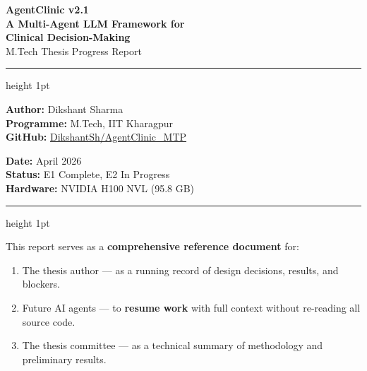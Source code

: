\documentclass[12pt, a4paper]{article}
\begin{document}

\begin{titlepage}
    \centering
    \vspace*{2cm}
    {\Huge\bfseries\color{iitblue} AgentClinic v2.1\\[0.4em]
    \large A Multi-Agent LLM Framework for\\Clinical Decision-Making\\[0.3em]}
    {\Large\color{gray} M.Tech Thesis Progress Report}
    \vspace{1.5cm}
    \hrule height 1pt
    \vspace{0.5cm}

    \begin{minipage}{0.48\textwidth}
        \textbf{Author:} Dikshant Sharma\\
        \textbf{Programme:} M.Tech, IIT Kharagpur\\
        \textbf{GitHub:} \href{https://github.com/DikshantSh/AgentClinic_MTP}{DikshantSh/AgentClinic\_MTP}
    \end{minipage}
    \hfill
    \begin{minipage}{0.48\textwidth}
        \textbf{Date:} April 2026\\
        \textbf{Status:} E1 Complete, E2 In Progress\\
        \textbf{Hardware:} NVIDIA H100 NVL (95.8 GB)
    \end{minipage}

    \vspace{0.5cm}
    \hrule height 1pt
    \vspace{1.5cm}

    \begin{tcolorbox}[colback=noteblue, colframe=iitblue!60, title=\textbf{Purpose of This Document}]
        This report serves as a \textbf{comprehensive reference document} for:
        \begin{enumerate}
            \item The thesis author — as a running record of design decisions, results, and blockers.
            \item Future AI agents — to \textbf{resume work} with full context without re-reading all source code.
            \item The thesis committee — as a technical summary of methodology and preliminary results.
        \end{enumerate}
    \end{tcolorbox}

    \vfill
    \tableofcontents
\end{titlepage}
\end{document}
